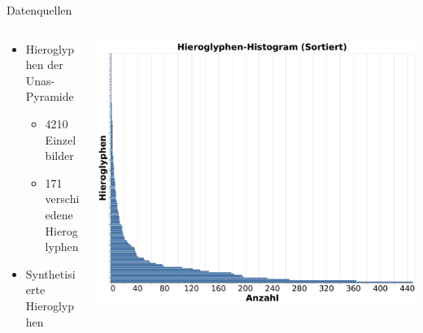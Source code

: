\documentclass[hyperref={pdfpagelabels=false}]{beamer}
\begin{document}
\begin{frame}{Datenquellen}
	\begin{columns}
		\begin{column}{0.5\textwidth}
			\begin{itemize}
				\item Hieroglyphen der Unas-Pyramide
				      \begin{itemize}
					      \item 4210 Einzelbilder
					      \item 171 verschiedene Hieroglyphen
				      \end{itemize}
				\item Synthetisierte Hieroglyphen
			\end{itemize}
		\end{column}
		\begin{column}{0.5\textwidth}  %
			\begin{center}
				\includegraphics[width=1\textwidth]{img/dia.pdf}
			\end{center}
		\end{column}
	\end{columns}
\end{frame}
\end{document}
